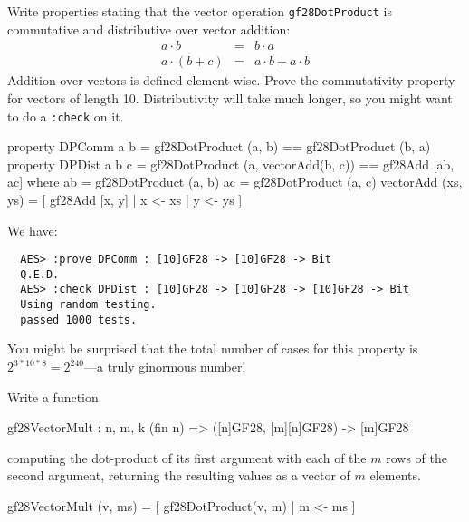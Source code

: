 \begin{Exercise}\label{ex:aesmc:1}
  Write properties stating that the vector operation
  \texttt{gf28DotProduct} is commutative and distributive over vector
  addition:
\begin{eqnarray*}
a \cdot b &=& b \cdot a \\
a \cdot (b + c) &=& a\cdot b + a\cdot b
\end{eqnarray*}
Addition over vectors is defined element-wise. Prove the commutativity
property for vectors of length 10.  Distributivity will take much
longer, so you might want to do a \texttt{:check} on it.\indCmdCheck
{}
\end{Exercise}
\begin{Answer}
\begin{code}
  property DPComm a b =     gf28DotProduct (a, b) == gf28DotProduct (b, a)
  property DPDist a b c =   gf28DotProduct (a, vectorAdd(b, c)) ==
                            gf28Add [ab, ac]
     where   ab = gf28DotProduct (a, b)
             ac = gf28DotProduct (a, c)
             vectorAdd (xs, ys) = [ gf28Add [x, y] | x <- xs
                                                   | y <- ys
                                  ]
\end{code}
We have:
\begin{Verbatim}
  AES> :prove DPComm : [10]GF28 -> [10]GF28 -> Bit
  Q.E.D.
  AES> :check DPDist : [10]GF28 -> [10]GF28 -> [10]GF28 -> Bit
  Using random testing.
  passed 1000 tests.
\end{Verbatim}
You might be surprised that the total number of cases for this
property is $2^{3*10*8} = 2^{240}$---a truly ginormous number!
\end{Answer}

\begin{Exercise}\label{ex:aesmc:2}
Write a function
\begin{code}
  gf28VectorMult : {n, m, k} (fin n) => ([n]GF28, [m][n]GF28) ->
                                         [m]GF28
\end{code}
computing the dot-product of its first argument with each of the $m$
rows of the second argument, returning the resulting values as a
vector of $m$ elements.
\end{Exercise}
\begin{Answer}
\begin{code}
  gf28VectorMult (v, ms) = [ gf28DotProduct(v, m) | m <- ms ]
\end{code}
\end{Answer}


